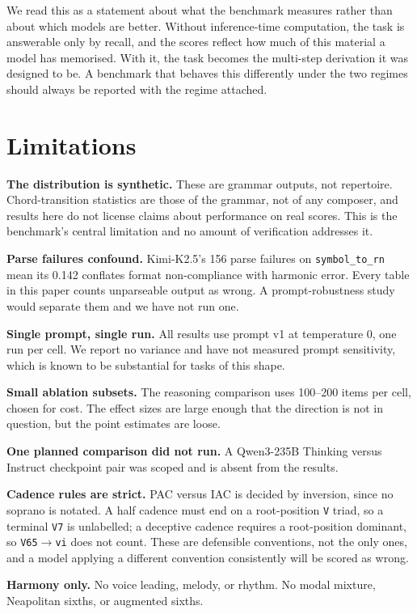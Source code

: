 \documentclass[11pt]{article}
\begin{document}
We read this as a statement about what the benchmark measures rather than about
which models are better. Without inference-time computation, the task is
answerable only by recall, and the scores reflect how much of this material a
model has memorised. With it, the task becomes the multi-step derivation it was
designed to be. A benchmark that behaves this differently under the two regimes
should always be reported with the regime attached.

\section{Limitations}

\textbf{The distribution is synthetic.} These are grammar outputs, not
repertoire. Chord-transition statistics are those of the grammar, not of any
composer, and results here do not license claims about performance on real
scores. This is the benchmark's central limitation and no amount of verification
addresses it.

\textbf{Parse failures confound.} Kimi-K2.5's 156 parse failures on
\texttt{symbol\_to\_rn} mean its 0.142 conflates format non-compliance with
harmonic error. Every table in this paper counts unparseable output as wrong. A
prompt-robustness study would separate them and we have not run one.

\textbf{Single prompt, single run.} All results use prompt v1 at temperature 0,
one run per cell. We report no variance and have not measured prompt
sensitivity, which is known to be substantial for tasks of this shape.

\textbf{Small ablation subsets.} The reasoning comparison uses 100--200 items per
cell, chosen for cost. The effect sizes are large enough that the direction is
not in question, but the point estimates are loose.

\textbf{One planned comparison did not run.} A Qwen3-235B Thinking versus
Instruct checkpoint pair was scoped and is absent from the results.

\textbf{Cadence rules are strict.} PAC versus IAC is decided by inversion, since
no soprano is notated. A half cadence must end on a root-position \texttt{V}
triad, so a terminal \texttt{V7} is unlabelled; a deceptive cadence requires a
root-position dominant, so \texttt{V65}$\to$\texttt{vi} does not count. These are
defensible conventions, not the only ones, and a model applying a different
convention consistently will be scored as wrong.

\textbf{Harmony only.} No voice leading, melody, or rhythm. No modal mixture,
Neapolitan sixths, or augmented sixths.
\end{document}
